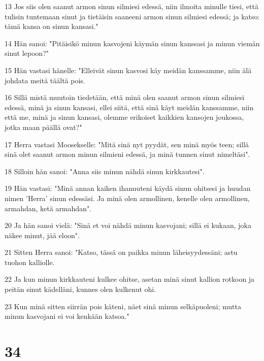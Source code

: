 \par 13 Jos siis olen saanut armon sinun silmiesi edessä, niin ilmoita minulle tiesi, että tulisin tuntemaan sinut ja tietäisin saaneeni armon sinun silmiesi edessä; ja katso: tämä kansa on sinun kansasi."
\par 14 Hän sanoi: "Pitäisikö minun kasvojeni käymän sinun kanssasi ja minun viemän sinut lepoon?"
\par 15 Hän vastasi hänelle: "Elleivät sinun kasvosi käy meidän kanssamme, niin älä johdata meitä täältä pois.
\par 16 Sillä mistä muutoin tiedetään, että minä olen saanut armon sinun silmiesi edessä, minä ja sinun kansasi, ellei siitä, että sinä käyt meidän kanssamme, niin että me, minä ja sinun kansasi, olemme erikoiset kaikkien kansojen joukossa, jotka maan päällä ovat?"
\par 17 Herra vastasi Moosekselle: "Mitä sinä nyt pyydät, sen minä myös teen; sillä sinä olet saanut armon minun silmieni edessä, ja minä tunnen sinut nimeltäsi".
\par 18 Silloin hän sanoi: "Anna siis minun nähdä sinun kirkkautesi".
\par 19 Hän vastasi: "Minä annan kaiken ihanuuteni käydä sinun ohitsesi ja huudan nimen 'Herra' sinun edessäsi. Ja minä olen armollinen, kenelle olen armollinen, armahdan, ketä armahdan".
\par 20 Ja hän sanoi vielä: "Sinä et voi nähdä minun kasvojani; sillä ei kukaan, joka näkee minut, jää eloon".
\par 21 Sitten Herra sanoi: "Katso, tässä on paikka minun läheisyydessäni; astu tuohon kalliolle.
\par 22 Ja kun minun kirkkauteni kulkee ohitse, asetan minä sinut kallion rotkoon ja peitän sinut kädelläni, kunnes olen kulkenut ohi.
\par 23 Kun minä sitten siirrän pois käteni, näet sinä minun selkäpuoleni; mutta minun kasvojani ei voi kenkään katsoa."

\chapter{34}

